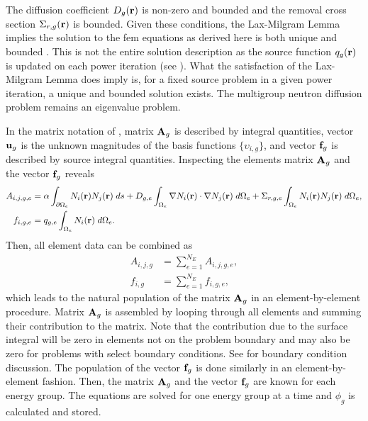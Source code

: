     The diffusion coefficient $D_g(\mathbf{r})$ is non-zero and bounded and the removal
    cross section $\Sigma_{r,g}(\mathbf{r})$ is bounded. Given these conditions, the
    Lax-Milgram Lemma implies the solution to the \gls{fem} equations as derived
    here is both unique and bounded \cite{textbookli}. This is not the entire
    solution description as the source function $q_g(\mathbf{r})$ is updated on each
    power iteration (see ). What the satisfaction of
    the Lax-Milgram Lemma does imply is, for a fixed source problem 
    in a given power iteration, a unique and bounded solution exists. The
    multigroup neutron diffusion problem remains an eigenvalue problem.
    
    In the matrix notation of , matrix $\mathbf{A}_g$ is 
    described by integral quantities, vector $\mathbf{u}_g$ is the unknown magnitudes 
    of the basis functions $\{\upsilon_{i,g}\}$, and vector $\mathbf{f}_g$ is described
    by source integral quantities. Inspecting the elements matrix $\mathbf{A}_g$ and
    the vector $\mathbf{f}_g$ reveals 
    \begin{align}
      \label{eq:matrix_population}
      A_{i,j,g,e} &= \alpha \int_{\partial \Omega_e} N_i(\mathbf{r}) 
        N_j(\mathbf{r}) \; ds + D_{g,e} 
        \int_{\Omega_e} \mathbf{\nabla} N_i(\mathbf{r}) \cdot \mathbf{\nabla} N_j(\mathbf{r}) \;
        d\Omega_e + \Sigma_{r,g,e} \int_{\Omega_e} N_i(\mathbf{r}) N_j(\mathbf{r})
        \; d\Omega_e, \\
      \label{eq:vector_population}
      f_{i,g,e} &= q_{g,e} \int_{\Omega_e} N_i(\mathbf{r}) \;d\Omega_e.
    \end{align}
    Then, all element data can be combined as
    \begin{align}
      A_{i,j,g} &= \sum_{e=1}^{N_E} A_{i,j,g,e}, \\
      f_{i,g} &=  \sum_{e=1}^{N_E} f_{i,g,e},
    \end{align}
    which leads to the natural population of the matrix $\mathbf{A}_g$ in an
    element-by-element procedure. Matrix $\mathbf{A}_g$ is assembled by looping through
    all elements and summing their contribution to the matrix. Note that the
    contribution due to the surface integral will be zero in elements not on the
    problem boundary and may also be zero for problems with select boundary
    conditions. See  for boundary condition
    discussion. The population of the vector $\mathbf{f}_g$ is done similarly in an
    element-by-element fashion. Then, the matrix $\mathbf{A}_g$ and the vector $\mathbf{f}_g$
    are known for each energy group. The equations are solved for one energy
    group at a time and $\phi_g$ is calculated and stored. 
    
